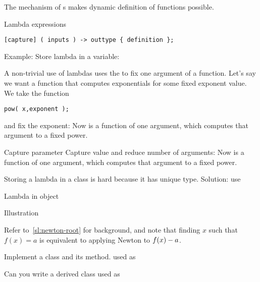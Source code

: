 
The mechanism of s makes
dynamic definition of functions possible.

\begin{block}{Lambda expressions}
  \label{sl:lambda-syntax}
\begin{verbatim}
[capture] ( inputs ) -> outtype { definition };
\end{verbatim}
Example:
Store lambda in a variable:
\end{block}

A non-trivial use of lambdas uses the  to fix one argument of a
function.
Let's say we want a function that computes exponentials for some fixed
exponent value. We take the 
 function
\begin{verbatim}
pow( x,exponent );
\end{verbatim}
and fix the exponent:
%
%
Now  is a function of one argument, which computes
that argument to a fixed power.

\begin{slide}{Capture parameter}
  \label{sl:lambda-capture}
  Capture value and reduce number of arguments:
  Now  is a function of one argument, which computes
  that argument to a fixed power.
\end{slide}

Storing a lambda in a class is hard because it has unique
type. Solution: use 

\begin{block}{Lambda in object}
  \label{sl:lambda-class}
\end{block}

\begin{block}{Illustration}
  \label{sl:lambda-classed}
\end{block}

\begin{exercise}
  \label{ex:newtonlambda}
  Refer to~\ref{sl:newton-root} for background, and note that finding
  $x$ such that $f(x)=a$ is equivalent to applying Newton to
  $f(x)-\nobreak a$.

  Implement a class  and its  method.
  used as
\end{exercise}

\begin{exercise}
  \label{ex:morenewtonlambda}
  Can you write a derived class  used as
\end{exercise}

